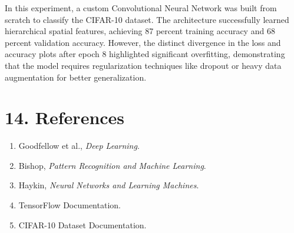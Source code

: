 \documentclass[11pt]{article}
\begin{document}
In this experiment, a custom Convolutional Neural Network was built from scratch to classify the CIFAR-10 dataset. The architecture successfully learned hierarchical spatial features, achieving 87 percent training accuracy and 68 percent validation accuracy. However, the distinct divergence in the loss and accuracy plots after epoch 8 highlighted significant overfitting, demonstrating that the model requires regularization techniques like dropout or heavy data augmentation for better generalization.

\section*{14. References}

\begin{enumerate}
\item Goodfellow et al., \emph{Deep Learning}.
\item Bishop, \emph{Pattern Recognition and Machine Learning}.
\item Haykin, \emph{Neural Networks and Learning Machines}.
\item TensorFlow Documentation.
\item CIFAR-10 Dataset Documentation.
\end{enumerate}
\end{document}
